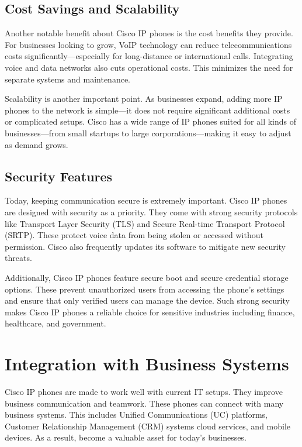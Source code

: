 \documentclass[11pt,a4paper]{article}
\begin{document}
\subsection*{Cost Savings and Scalability}


Another notable benefit about Cisco IP phones is the cost benefits they provide. For businesses looking to grow, VoIP technology can reduce telecommunications costs significantly—especially for long-distance or international calls. Integrating voice and data networks also cuts operational costs. This minimizes the need for separate systems and maintenance.

Scalability is another important point. As businesses expand, adding more IP phones to the network is simple—it does not require significant additional costs or complicated setups. Cisco has a wide range of IP phones suited for all kinds of businesses—from small startups to large corporations—making it easy to adjust as demand grows.

\subsection*{Security Features}

Today, keeping communication secure is extremely important. Cisco IP phones are designed with security as a priority. They come with strong security protocols like Transport Layer Security (TLS) and Secure Real-time Transport Protocol (SRTP). These protect voice data from being stolen or accessed without permission. Cisco also frequently updates its software to mitigate new security threats.

Additionally, Cisco IP phones feature secure boot and secure credential storage options. These prevent unauthorized users from accessing the phone’s settings and ensure that only verified users can manage the device. Such strong security makes Cisco IP phones a reliable choice for sensitive industries including finance, healthcare, and government.

\section*{Integration with Business Systems}

Cisco IP phones are made to work well with current IT setups. They improve business communication and teamwork. These phones can connect with many business systems. This includes Unified Communications (UC) platforms, Customer Relationship Management (CRM) systems cloud services, and mobile devices. As a result, become a valuable asset for today’s businesses.
\end{document}
